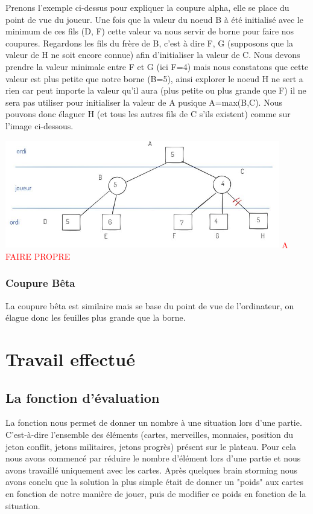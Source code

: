 \documentclass[a4paper, 12pt, french]{article}
\begin{document}
	Prenons l'exemple ci-dessus pour expliquer la coupure alpha, elle se place du point de vue du joueur.
	Une fois que la valeur du noeud B à été initialisé avec le minimum de ces fils (D, F) cette valeur va nous
	servir de borne pour faire nos coupures. Regardons les fils du frère de B, c'est à dire F, G (supposons que
	la valeur de H ne soit encore connue) afin d'initialiser la valeur de C. Nous devons prendre la valeur minimale
	entre F et G (ici F=4) mais nous constatons que cette valeur est plus petite que notre borne (B=5), ainsi explorer
	le noeud H ne sert a rien car peut importe la valeur qu'il aura (plus petite ou plus grande que F) il ne sera pas
	utiliser pour initialiser la valeur de A pusique A=max(B,C). Nous pouvons donc élaguer H (et tous les autres fils
	de C s'ils existent) comme sur l'image ci-dessous.

	\includegraphics[width=12cm]{images/elagageAlphaSuite.JPG}
	\textcolor{red}{A FAIRE PROPRE}

	\subsubsection{Coupure Bêta}
	La coupure bêta est similaire mais se base du point de vue de l'ordinateur, on élague donc les
	feuilles plus grande que la borne\cite{wiki_7_wonder}.

	\section{Travail effectué}
	\subsection{La fonction d'évaluation}
	La fonction nous permet de donner un nombre à une situation lors d'une partie. C'est-à-dire l'ensemble
	des éléments (cartes, merveilles, monnaies, position du jeton conflit, jetons militaires, jetons progrès)
	présent sur le plateau. Pour cela nous avons commencé par réduire le nombre d'élément lors d'une partie et nous
	avons travaillé uniquement avec les cartes. Après quelques brain storming nous avons conclu que la solution la
	plus simple était de donner un "poids" aux cartes en fonction de notre manière de jouer, puis de modifier ce poids
	en fonction de la situation.
\end{document}
